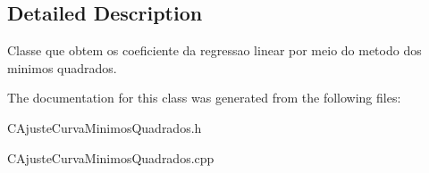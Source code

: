 \subsection{Detailed Description}
Classe que obtem os coeficiente da regressao linear por meio do metodo dos minimos quadrados. 

The documentation for this class was generated from the following files\-:\begin{DoxyCompactItemize}
\item 
C\-Ajuste\-Curva\-Minimos\-Quadrados.\-h\item 
C\-Ajuste\-Curva\-Minimos\-Quadrados.\-cpp\end{DoxyCompactItemize}
